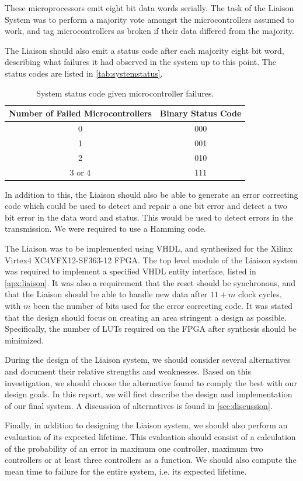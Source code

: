 These microprocessors emit eight bit data words serially. The task of
the Liaison System was to perform a majority vote amongst the
microcontrollers assumed to work, and tag microcontrollers as broken
if their data differed from the majority.

The Liaison should also emit a status code after each majority eight
bit word, describing what failures it had observed in the system up to
this point. The status codes are listed in \autoref{tab:systemstatus}.

\begin{table}[htbp]
  \centering
  \begin{tabular}{|c|c|}
    \hline
    \textbf{Number of Failed Microcontrollers} & \textbf{Binary Status Code} \\ \hline
    0 & 000 \\ \hline
    1 & 001 \\ \hline
    2 & 010 \\ \hline
    3 or 4 & 111 \\ \hline
  \end{tabular}
  \caption{System status code given microcontroller failures.}
  \label{tab:systemstatus}
\end{table}

In addition to this, the Liaison should also be able to generate an
error correcting code which could be used to detect and repair a one
bit error and detect a two bit error in the data word and status. This
would be used to detect errors in the transmission. We were required
to use a Hamming code\cite{task}\cite{ecc}.

The Liaison was to be implemented using VHDL, and synthesized for the
Xilinx Virtex4 XC4VFX12-SF363-12 FPGA. The top level module of the
Liaison system was required to implement a specified VHDL entity
interface, listed in \autoref{apx:liaison}. It was also a requirement
that the {\ttfamily reset} should be synchronous, and that the Liaison
should be able to handle new data after $11 + m$ clock cycles, with $m$
been the number of bits used for the error correcting code.
It was stated that the design should focus on creating an area stringent
a design as possible. Specifically, the number of LUTs required on the FPGA after
synthesis should be minimized.

During the design of the Liaison system, we should consider several
alternatives and document their relative strengths and
weaknesses. Based on this investigation, we should choose the
alternative found to comply the best with our design goals. In this
report, we will first describe the design and implementation of our
final system. A discussion of alternatives is found in
\autoref{sec:discussion}.

Finally, in addition to designing the Liaison system, we should also
perform an evaluation of its expected lifetime. This evaluation should
consist of a calculation of the probability of an error in maximum one
controller, maximum two controllers or at least three controllers as a
function. We should also compute the mean time to failure for the
entire system, i.e. its expected lifetime.
